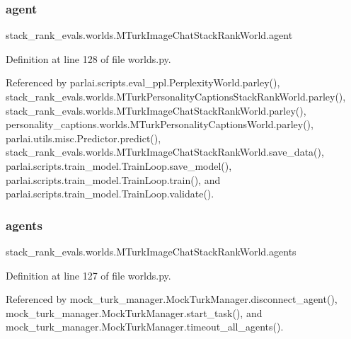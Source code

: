 \subsubsection{\texorpdfstring{agent}{agent}}
{\footnotesize\ttfamily stack\+\_\+rank\+\_\+evals.\+worlds.\+M\+Turk\+Image\+Chat\+Stack\+Rank\+World.\+agent}



Definition at line 128 of file worlds.\+py.



Referenced by parlai.\+scripts.\+eval\+\_\+ppl.\+Perplexity\+World.\+parley(), stack\+\_\+rank\+\_\+evals.\+worlds.\+M\+Turk\+Personality\+Captions\+Stack\+Rank\+World.\+parley(), stack\+\_\+rank\+\_\+evals.\+worlds.\+M\+Turk\+Image\+Chat\+Stack\+Rank\+World.\+parley(), personality\+\_\+captions.\+worlds.\+M\+Turk\+Personality\+Captions\+World.\+parley(), parlai.\+utils.\+misc.\+Predictor.\+predict(), stack\+\_\+rank\+\_\+evals.\+worlds.\+M\+Turk\+Image\+Chat\+Stack\+Rank\+World.\+save\+\_\+data(), parlai.\+scripts.\+train\+\_\+model.\+Train\+Loop.\+save\+\_\+model(), parlai.\+scripts.\+train\+\_\+model.\+Train\+Loop.\+train(), and parlai.\+scripts.\+train\+\_\+model.\+Train\+Loop.\+validate().

\mbox{\label{classstack__rank__evals_1_1worlds_1_1MTurkImageChatStackRankWorld_a3c5fb45d68aec332f20317c2364227c7}} 
\subsubsection{\texorpdfstring{agents}{agents}}
{\footnotesize\ttfamily stack\+\_\+rank\+\_\+evals.\+worlds.\+M\+Turk\+Image\+Chat\+Stack\+Rank\+World.\+agents}



Definition at line 127 of file worlds.\+py.



Referenced by mock\+\_\+turk\+\_\+manager.\+Mock\+Turk\+Manager.\+disconnect\+\_\+agent(), mock\+\_\+turk\+\_\+manager.\+Mock\+Turk\+Manager.\+start\+\_\+task(), and mock\+\_\+turk\+\_\+manager.\+Mock\+Turk\+Manager.\+timeout\+\_\+all\+\_\+agents().

